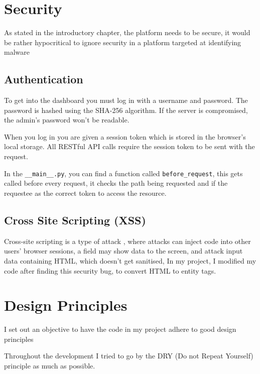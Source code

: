 \section{Security}
As stated in the introductory chapter, the platform needs to be secure,
it would be rather hypocritical to ignore security in a
platform targeted at identifying malware

\subsection{Authentication}
To get into the dashboard you must log in with a username and password.
The password is hashed using the SHA-256 algorithm.
If the server is compromised, the admin's password won't be readable.

When you log in you are given a session token which is stored in the browser's local storage.
All RESTful API calls require the session token to be sent with the request.

In the \texttt{\_\_main\_\_.py}, you can find a function
called \texttt{before\_request},
this gets called before every request, it checks the path being requested
and if the requestee as the correct token to access the resource.

\subsection{Cross Site Scripting (XSS)}
Cross-site scripting is a type of attack \cite{XSS},
where attacks can inject code into other users' browser sessions,
a field may show data to the screen, and attack input data containing HTML,
which doesn't get sanitised, In my project, I modified my code
after finding this security bug, to convert HTML to entity tags. 

\section {Design Principles}
I set out an objective to have the code in my project
adhere to good design principles

Throughout the development I tried to go by the DRY
(Do not Repeat Yourself) principle as much as possible.
